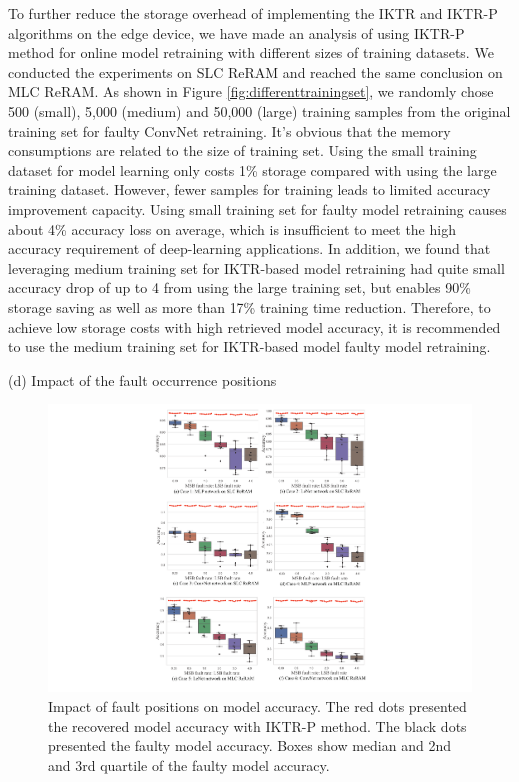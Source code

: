 To further reduce the storage overhead of implementing the IKTR and IKTR-P algorithms on the edge device, we have made an analysis of using IKTR-P method for online model retraining with different sizes of training datasets. We conducted the experiments on SLC ReRAM and reached the same conclusion on MLC ReRAM. As shown in Figure \ref{fig:differenttrainingset}, we randomly chose 500 (small), 5,000 (medium) and 50,000 (large) training samples from the original training set for faulty ConvNet retraining. It’s obvious that the memory consumptions are related to the size of training set. Using the small training dataset for model learning only costs {1\%} storage compared with using the large training dataset. However, fewer samples for training leads to limited accuracy improvement capacity. Using small training set for faulty model retraining causes about {4\%} accuracy loss on average, which is insufficient to meet the high accuracy requirement of deep-learning applications. In addition, we found that leveraging medium training set for  IKTR-based model retraining had quite small accuracy drop of up to {4\textperthousand} from using the large training set, but enables {90\%} storage saving as well as more than {17\%} training time reduction. %
Therefore, to achieve low storage costs with high retrieved model accuracy, it is recommended to use the medium training set for IKTR-based model faulty model retraining.


(d) Impact of the fault occurrence positions

\begin{figure}
    \centering
    \includegraphics[width=0.9\linewidth]{images/OL-fig18}
    \caption{Impact of fault positions on model accuracy. The red dots presented the recovered model accuracy with IKTR-P method. The black dots presented the faulty model accuracy. Boxes show median and 2nd and 3rd quartile of the faulty model accuracy.}
    \label{fig:proportionalfaultinjectresult}
    \vspace{-10pt}
\end{figure}

